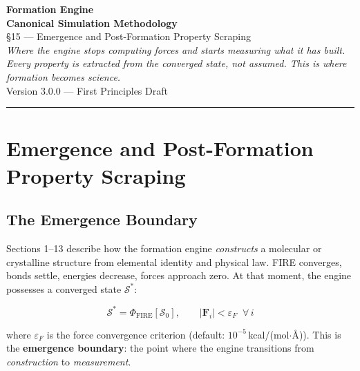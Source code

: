 \documentclass[11pt, a4paper, oneside]{article}
\theoremstyle{definition}
\theoremstyle{remark}
\begin{document}
\begin{center}
  {\LARGE\bfseries Formation Engine}\\[0.3em]
  {\LARGE\bfseries Canonical Simulation Methodology}\\[1.2em]
  {\large §15 — Emergence and Post-Formation Property Scraping}\\[1.5em]
  {\normalsize
    \textit{Where the engine stops computing forces and starts measuring
    what it has built. Every property is extracted from the converged
    state, not assumed. This is where formation becomes science.}}\\[1.5em]
  {\small Version 3.0.0 — First Principles Draft}
\end{center}

\vspace{1em}
\hrule
\vspace{2em}

\section{Emergence and Post-Formation Property Scraping}
\label{sec:emergence}

\subsection{The Emergence Boundary}
\label{sec:emergence-boundary}

Sections 1--13 describe how the formation engine \textit{constructs} a
molecular or crystalline structure from elemental identity and physical
law.  FIRE converges, bonds settle, energies decrease, forces approach
zero.  At that moment, the engine possesses a converged state
$\mathcal{S}^*$:

\begin{equation}
\label{eq:converged-state}
\mathcal{S}^* = \Phi_{\text{FIRE}}[\mathcal{S}_0],
\qquad
|\mathbf{F}_i| < \varepsilon_F \;\;\forall\, i
\end{equation}

where $\varepsilon_F$ is the force convergence criterion (default:
$10^{-5}$\,kcal/(mol$\cdot$\AA)).  This is the \textbf{emergence
boundary}: the point where the engine transitions from
\textit{construction} to \textit{measurement}.
\end{document}
